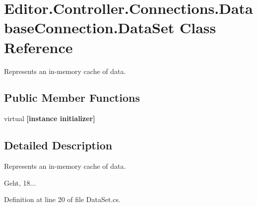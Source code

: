 \section{Editor.\-Controller.\-Connections.\-Database\-Connection.\-Data\-Set Class Reference}
\label{class_editor_1_1_controller_1_1_connections_1_1_database_connection_1_1_data_set}


Represents an in-\/memory cache of data.  


\subsection*{Public Member Functions}
\begin{DoxyCompactItemize}
\item 
virtual {\bfseries [instance initializer]}\label{class_editor_1_1_controller_1_1_connections_1_1_database_connection_1_1_data_set_a12f186105fce06907ec2c1e6ba08f1be}

\end{DoxyCompactItemize}


\subsection{Detailed Description}
Represents an in-\/memory cache of data. 

Geht, 18... 

Definition at line 20 of file Data\-Set.\-cs.

